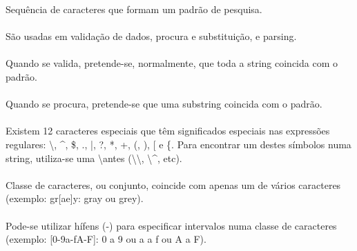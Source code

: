 \documentclass[../resumosLTW.tex]{subfiles}
\begin{document}
 

Sequência de caracteres que formam um padrão de pesquisa.

\paragraph{}

São usadas em validação de dados, procura e substituição, e parsing.

\paragraph{}

Quando se valida, pretende-se, normalmente, que toda a string coincida com o padrão.

\paragraph{}

Quando se procura, pretende-se que uma substring coincida com o padrão.

\paragraph{}

Existem 12 caracteres especiais que têm significados especiais nas expressões regulares: \textbackslash, \^{}, \$, ., |, ?, *, +, (, ), [ e \{.
Para encontrar um destes símbolos numa string, utiliza-se uma \textbackslash antes (\textbackslash\textbackslash, \textbackslash\^{}, etc).

\paragraph{}

Classe de caracteres, ou conjunto, coincide com apenas um de vários caracteres (exemplo: gr[ae]y: gray ou grey).

\paragraph{}

Pode-se utilizar hífens (-) para especificar intervalos numa classe de caracteres (exemplo: [0-9a-fA-F]: 0 a 9 ou a a f ou A a F).

\paragraph{}
\end{document}

